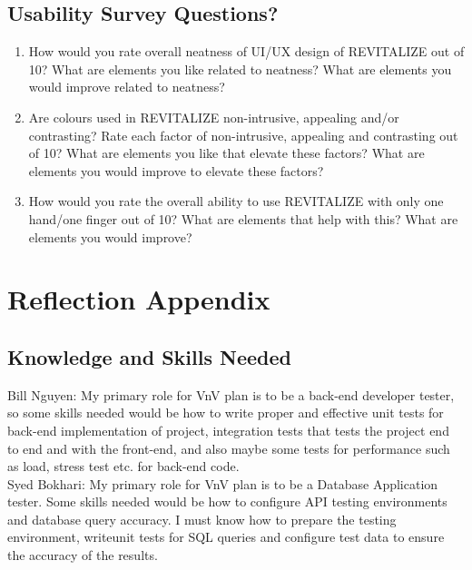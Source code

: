 \documentclass[12pt, titlepage]{article}
\begin{document}
\subsection{Usability Survey Questions?}


\begin{enumerate}
	\item How would you rate overall neatness of UI/UX design of REVITALIZE out of 10? What are elements you like related to neatness? What are elements you would improve related to neatness?
	\item Are colours used in REVITALIZE non-intrusive, appealing and/or contrasting? Rate each factor of non-intrusive, appealing and contrasting out of 10? What are elements you like that elevate these factors? What are elements you would improve to elevate these factors?
	\item How would you rate the overall ability to use REVITALIZE with only one hand/one finger out of 10? What are elements that help with this? What are elements you would improve?
\end{enumerate}

\section{Reflection Appendix}

\subsection{Knowledge and Skills Needed}

\noindent Bill Nguyen: My primary role for VnV plan is to be a back-end developer tester, so some skills needed would be how to write proper and effective unit tests for back-end implementation of project, integration tests that tests the project end to end and with the front-end, and also maybe some tests for performance such as load, stress test etc. for back-end code.\\

\noindent Syed Bokhari: My primary role for VnV plan is to be a Database Application tester. Some skills needed would be how to configure API testing environments and database query accuracy. I must know how to prepare the testing environment, writeunit tests for SQL queries and configure test data to ensure the accuracy of the results.\\
\end{document}
